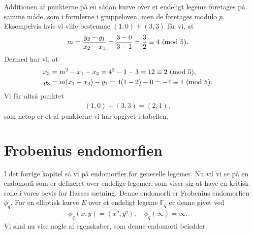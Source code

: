 Additionen af punkterne på en sådan kurve over et endeligt legeme foretages på samme måde, som i formlerne i gruppeloven, men de foretages modulo $p$. Eksempelvis hvis vi ville bestemme $(1,0) + (3,3)$ får vi, at 
\begin{align*} 
	m = \frac{y_2 - y_1}{x_2 - x_1} = \frac{3 - 0}{3 - 1} = \frac{3}{2} \equiv 4 \ (\mathrm{mod} \ 5).
\end{align*}
Dermed har vi, at 
\begin{align*}
	x_3 &= m^2 - x_1 - x_2 = 4^2 - 1 - 3 = 12 \equiv 2 \ (\mathrm{mod} \ 5), \\
	y_3 &= m(x_1 - x_3) - y_1 = 4(1-2)-0 = -4 \equiv 1 \ (\mathrm{mod} \ 5).
\end{align*}
Vi får altså punktet
\begin{align*}
	(1, 0) + (3, 3) = (2, 1),
\end{align*}
som netop er ét af punkterne vi har opgivet i tabellen.

\section{Frobenius endomorfien}

I det forrige kapitel så vi på endomorfier for generelle legemer. Nu vil vi se på en endomorfi som er defineret over endelige legemer, som viser sig at have en kritisk rolle i vores bevis for Hasses sætning. Denne endomorfi er Frobenius endomorfien $\phi_q$. For en elliptisk kurve $E$ over et endeligt legeme $\mathbb{F}_q$ er denne givet ved
\begin{align}
	\phi_q (x, y) = (x^q, y^q), \quad \phi_q(\infty) = \infty.
\end{align}
Vi skal nu vise nogle af egenskaber, som denne endomorfi beisdder.

